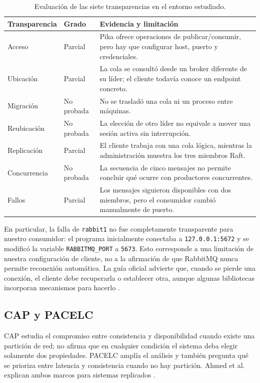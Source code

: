 \documentclass[12pt,a4paper]{article}
\begin{document}
\begin{table}[H]
\centering\footnotesize
\caption{Evaluación de las siete transparencias en el entorno estudiado.}
\begin{tabularx}{\linewidth}{@{}p{2.1cm}p{1.5cm}X@{}}
\toprule
Transparencia & Grado & Evidencia y limitación \\
\midrule
Acceso & Parcial & Pika ofrece operaciones de publicar/consumir, pero hay que configurar host, puerto y credenciales. \\
Ubicación & Parcial & La cola se consultó desde un broker diferente de su líder; el cliente todavía conoce un endpoint concreto. \\
Migración & No probada & No se trasladó una cola ni un proceso entre máquinas. \\
Reubicación & No probada & La elección de otro líder no equivale a mover una sesión activa sin interrupción. \\
Replicación & Parcial & El cliente trabaja con una cola lógica, mientras la administración muestra los tres miembros Raft. \\
Concurrencia & No probada & La secuencia de cinco mensajes no permite concluir qué ocurre con productores concurrentes. \\
Fallos & Parcial & Los mensajes siguieron disponibles con dos miembros, pero el consumidor cambió manualmente de puerto. \\
\bottomrule
\end{tabularx}
\label{tab:transparencias}
\end{table}

En particular, la falla de \texttt{rabbit1} no fue completamente transparente para nuestro consumidor: el programa inicialmente conectaba a \texttt{127.0.0.1:5672} y se modificó la variable \texttt{RABBITMQ\_PORT} a \texttt{5673}. Esto corresponde a una limitación de nuestra configuración de cliente, no a la afirmación de que RabbitMQ nunca permite reconexión automática. La guía oficial advierte que, cuando se pierde una conexión, el cliente debe recuperarla o establecer otra, aunque algunas bibliotecas incorporan mecanismos para hacerlo \cite{RabbitMQReliability2026}.

\subsection{CAP y PACELC}
CAP estudia el compromiso entre consistencia y disponibilidad cuando existe una partición de red; no afirma que en cualquier condición el sistema deba elegir solamente dos propiedades. PACELC amplía el análisis y también pregunta qué se prioriza entre latencia y consistencia cuando no hay partición. Ahmed et al. explican ambos marcos para sistemas replicados \cite{Ahmed2023}.
\end{document}
